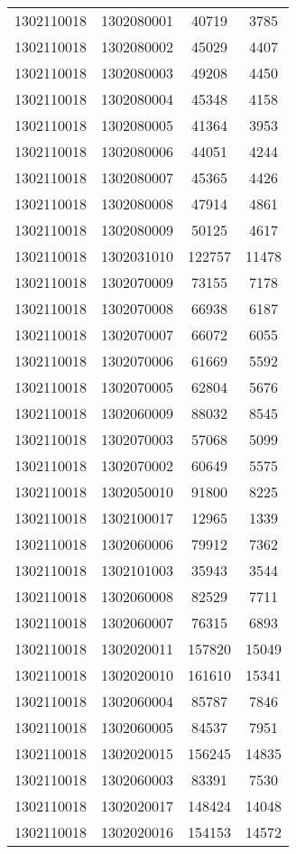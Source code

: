 \begin{longtable}{llcc}
1302110018 & 1302080001 & 40719 & 3785\\
1302110018 & 1302080002 & 45029 & 4407\\
1302110018 & 1302080003 & 49208 & 4450\\
1302110018 & 1302080004 & 45348 & 4158\\
1302110018 & 1302080005 & 41364 & 3953\\
1302110018 & 1302080006 & 44051 & 4244\\
1302110018 & 1302080007 & 45365 & 4426\\
1302110018 & 1302080008 & 47914 & 4861\\
1302110018 & 1302080009 & 50125 & 4617\\
1302110018 & 1302031010 & 122757 & 11478\\
1302110018 & 1302070009 & 73155 & 7178\\
1302110018 & 1302070008 & 66938 & 6187\\
1302110018 & 1302070007 & 66072 & 6055\\
1302110018 & 1302070006 & 61669 & 5592\\
1302110018 & 1302070005 & 62804 & 5676\\
1302110018 & 1302060009 & 88032 & 8545\\
1302110018 & 1302070003 & 57068 & 5099\\
1302110018 & 1302070002 & 60649 & 5575\\
1302110018 & 1302050010 & 91800 & 8225\\
1302110018 & 1302100017 & 12965 & 1339\\
1302110018 & 1302060006 & 79912 & 7362\\
1302110018 & 1302101003 & 35943 & 3544\\
1302110018 & 1302060008 & 82529 & 7711\\
1302110018 & 1302060007 & 76315 & 6893\\
1302110018 & 1302020011 & 157820 & 15049\\
1302110018 & 1302020010 & 161610 & 15341\\
1302110018 & 1302060004 & 85787 & 7846\\
1302110018 & 1302060005 & 84537 & 7951\\
1302110018 & 1302020015 & 156245 & 14835\\
1302110018 & 1302060003 & 83391 & 7530\\
1302110018 & 1302020017 & 148424 & 14048\\
1302110018 & 1302020016 & 154153 & 14572\\

\end{longtable}
